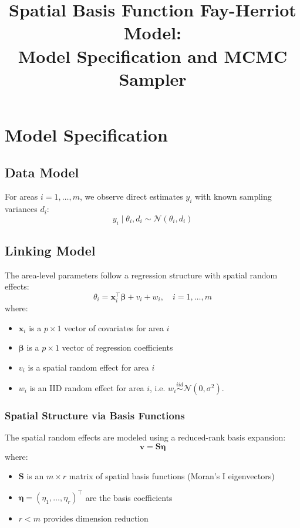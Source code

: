 \documentclass[12pt]{article}
\title{Spatial Basis Function Fay-Herriot Model:\\Model Specification and MCMC Sampler}
\author{}
\date{}
\begin{document}
\maketitle

\section{Model Specification}

\subsection{Data Model}
For areas $i = 1, \ldots, m$, we observe direct estimates $y_i$ with known sampling variances $d_i$:
\begin{equation}
y_i \mid \theta_i, d_i \sim \mathcal{N}(\theta_i, d_i)
\end{equation}

\subsection{Linking Model}
The area-level parameters follow a regression structure with spatial random effects:
\begin{equation}
\theta_i = \mathbf{x}_i^\top \boldsymbol{\beta} + v_i + w_i, \quad i = 1, \ldots, m
\end{equation}
where:
\begin{itemize}
    \item $\mathbf{x}_i$ is a $p \times 1$ vector of covariates for area $i$
    \item $\boldsymbol{\beta}$ is a $p \times 1$ vector of regression coefficients
    \item $v_i$ is a spatial random effect for area $i$
    \item $w_i$ is an IID random effect for area $i$, i.e. $w_i \overset{iid}{\sim} \mathcal{N}(0, \sigma^2)$.
\end{itemize}

\subsubsection*{Spatial Structure via Basis Functions}
The spatial random effects are modeled using a reduced-rank basis expansion:
\begin{equation}
\mathbf{v} = \mathbf{S} \boldsymbol{\eta}
\end{equation}
where:
\begin{itemize}
    \item $\mathbf{S}$ is an $m \times r$ matrix of spatial basis functions (Moran's I eigenvectors)
    \item $\boldsymbol{\eta} = (\eta_1, \ldots, \eta_r)^\top$ are the basis coefficients
    \item $r < m$ provides dimension reduction
\end{itemize}
\end{document}
